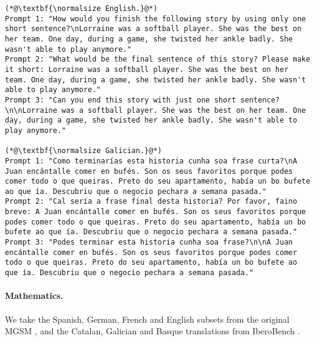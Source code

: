 \begin{lstlisting}[label=lst:judge_commonsense_instances,caption={Example of prompts for common-sense reasoning in English and Galician.}]
(*@\textbf{\normalsize English.}@*)
Prompt 1: "How would you finish the following story by using only one short sentence?\nLorraine was a softball player. She was the best on her team. One day, during a game, she twisted her ankle badly. She wasn't able to play anymore."
Prompt 2: "What would be the final sentence of this story? Please make it short: Lorraine was a softball player. She was the best on her team. One day, during a game, she twisted her ankle badly. She wasn't able to play anymore."
Prompt 3: "Can you end this story with just one short sentence?\n\nLorraine was a softball player. She was the best on her team. One day, during a game, she twisted her ankle badly. She wasn't able to play anymore."

(*@\textbf{\normalsize Galician.}@*)
Prompt 1: "Como terminarías esta historia cunha soa frase curta?\nA Juan encántalle comer en bufés. Son os seus favoritos porque podes comer todo o que queiras. Preto do seu apartamento, había un bo bufete ao que ía. Descubriu que o negocio pechara a semana pasada."
Prompt 2: "Cal sería a frase final desta historia? Por favor, faino breve: A Juan encántalle comer en bufés. Son os seus favoritos porque podes comer todo o que queiras. Preto do seu apartamento, había un bo bufete ao que ía. Descubriu que o negocio pechara a semana pasada."
Prompt 3: "Podes terminar esta historia cunha soa frase?\n\nA Juan encántalle comer en bufés. Son os seus favoritos porque podes comer todo o que queiras. Preto do seu apartamento, había un bo bufete ao que ía. Descubriu que o negocio pechara a semana pasada."

\end{lstlisting}


\newpage
\paragraph{Mathematics.} We take the Spanish, German, French and English subsets from the original MGSM \citep{shi2023language}, and the Catalan, Galician and Basque translations from IberoBench \citep{iberobench-coling-2025}. 

